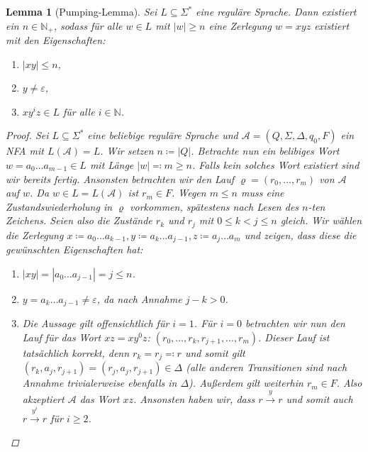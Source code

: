 \documentclass[11pt, a4paper]{article}
\theoremstyle{definition}
\theoremstyle{plain}
\newtheorem{lemma}[definition]{Lemma}
\numberwithin{equation}{section}
\newcommand{\reaches}[1]{\overset{#1}{\rightarrow}}
\begin{document}
\begin{lemma}[Pumping-Lemma]
	Sei \( L \subseteq \Sigma^\ast \) eine reguläre Sprache. Dann existiert ein \( n \in \mathbb{N}_+ \), sodass für alle \( w \in L \) mit \( \left| w \right| \geq n \) eine Zerlegung \( w = xyz \) existiert mit den Eigenschaften:
	\begin{enumerate}
		\item \( \left| xy \right| \leq n \),
		\item \( y \neq \varepsilon \),
		\item \( xy^iz \in L \) für alle \( i \in \mathbb{N} \). 
	\end{enumerate}
	\begin{proof}
		Sei \( L \subseteq \Sigma^\ast \) eine beliebige reguläre Sprache und \( \mathcal{A} = (Q, \Sigma, \Delta, q_0, F) \) ein NFA mit \( L(\mathcal{A}) = L \). Wir setzen \( n \coloneqq \left| Q \right| \). Betrachte nun ein belibiges Wort \( w = a_0 \ldots a_{m-1} \in L \) mit Länge \( \left| w \right| \eqqcolon m \geq n \). Falls kein solches Wort existiert sind wir bereits fertig. Ansonsten betrachten wir den Lauf \( \varrho = (r_0, \ldots, r_m) \) von \( \mathcal{A} \) auf \( w \). Da \( w \in L = L(\mathcal{A}) \) ist \( r_m \in F \). Wegen \( m \leq n \) muss eine Zustandswiederholung in \( \varrho \) vorkommen, spätestens nach Lesen des \(n\)-ten Zeichens. Seien also die Zustände \( r_k \) und \( r_j \) mit \( 0 \leq k < j \leq n \) gleich. Wir wählen die Zerlegung \( x \coloneqq a_0 \ldots a_{k-1}, y \coloneqq a_k \ldots a_{j-1}, z \coloneqq a_j \ldots a_m \) und zeigen, dass diese die gewünschten Eigenschaften hat:
		\begin{enumerate}
			\item \( \left| xy \right| = \left| a_0 \ldots a_{j-1} \right| = j \leq n \). \checkmark
			\item \( y = a_k \ldots a_{j-1} \neq \varepsilon \), da nach Annahme \( j-k > 0 \). \checkmark
			\item Die Aussage gilt offensichtlich für \( i = 1 \). Für \( i = 0 \) betrachten wir nun den Lauf für das Wort \( xz = xy^0z \): \( (r_0, \ldots, r_k, r_{j+1}, \ldots, r_m) \). Dieser Lauf ist tatsächlich korrekt, denn \( r_k = r_j \eqqcolon r \) und somit gilt \( (r_k, a_j, r_{j+1}) = (r_j, a_j, r_{j+1}) \in \Delta \) (alle anderen Transitionen sind nach Annahme trivialerweise ebenfalls in \( \Delta \)). Außerdem gilt weiterhin \( r_m \in F \). Also akzeptiert \( \mathcal{A} \) das Wort \( xz \). Ansonsten haben wir, dass \( r \reaches{y} r \) und somit auch \( r \reaches{y^i} r \) für \( i \geq 2 \).\checkmark \qedhere
		\end{enumerate}
	\end{proof}
\end{lemma}
\end{document}
